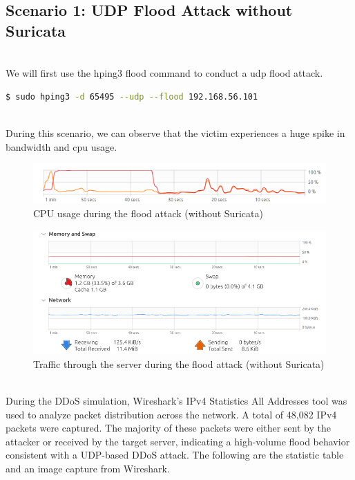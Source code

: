 \subsection{Scenario 1: UDP Flood Attack without Suricata}
\\We will first use the hping3 flood command to conduct a udp flood attack.
\begin{lstlisting}[language=bash,caption={Content of ddos.sh}]
$ sudo hping3 -d 65495 --udp --flood 192.168.56.101
\end{lstlisting}
\\During this scenario, we can observe that the victim experiences a huge spike in bandwidth and cpu usage.
\\
\begin{figure}[!htb]
    \centering
    \includegraphics[width=0.8\linewidth]{thesis/cpuAfter.png}
    \caption{CPU usage during the flood attack (without Suricata)}
    \label{fig:enter-label}
\end{figure}
\begin{figure}[!htb]
    \centering
    \includegraphics[width=0.8\linewidth]{thesis/afterAttack.png}
    \caption{Traffic through the server during the flood attack (without Suricata)}
    \label{fig:enter-label}
\end{figure}
\\
During the DDoS simulation, Wireshark's IPv4 Statistics \– All Addresses tool was used to analyze packet distribution across the network. A total of 48,082 IPv4 packets were captured. The majority of these packets were either sent by the attacker or received by the target server, indicating a high-volume flood behavior consistent with a UDP-based DDoS attack. The following are the statistic table and an image capture from Wireshark.
